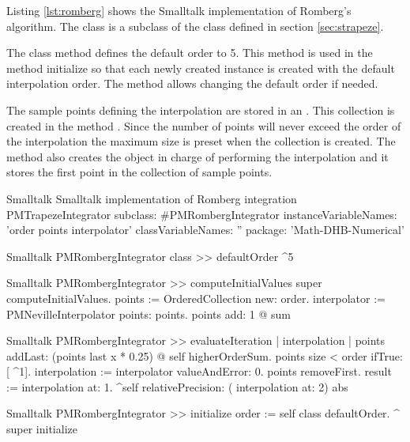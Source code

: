 Listing \ref{lst:romberg} shows the Smalltalk implementation of Romberg's algorithm. The class  is a subclass of the class  defined in section \ref{sec:strapeze}.

The class method  defines the default order to
5. This method is used in the method initialize so that each newly
created instance is created with the default interpolation order.
The method  allows changing the default order if
needed.

The sample points defining the interpolation are stored in an . This collection is created in the method .
Since the number of points will never exceed the order of the interpolation the maximum size is preset when the collection is created.
The method  also creates the object in charge of performing the interpolation and it stores the first point in the collection of sample points.
\begin{listing}[label=lst:romberg]{Smalltalk}
{Smalltalk implementation of Romberg integration}
PMTrapezeIntegrator subclass: #PMRombergIntegrator
   instanceVariableNames: 'order points interpolator'
   classVariableNames: ''
   package: 'Math-DHB-Numerical'
\end{listing}

\begin{displaycode}{Smalltalk}
PMRombergIntegrator class >> defaultOrder
    ^5
\end{displaycode}

\begin{displaycode}{Smalltalk}
PMRombergIntegrator >> computeInitialValues
    super computeInitialValues.
    points := OrderedCollection new: order.
    interpolator := PMNevilleInterpolator points: points.
    points add: 1 @ sum
\end{displaycode}

\begin{displaycode}{Smalltalk}
PMRombergIntegrator >> evaluateIteration
    | interpolation |
    points addLast: (points last x * 0.25) @ self higherOrderSum.
    points size < order
        ifTrue: [ ^1].
    interpolation := interpolator valueAndError: 0.
    points removeFirst.
    result := interpolation at: 1.
    ^self relativePrecision: ( interpolation at: 2) abs
\end{displaycode}

\begin{displaycode}{Smalltalk}
PMRombergIntegrator >> initialize
    order := self class defaultOrder.
    ^ super initialize
\end{displaycode}

